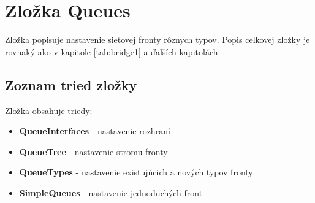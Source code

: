 \section{Zložka Queues}
Zložka popisuje nastavenie sieťovej fronty rôznych typov. Popis celkovej zložky je rovnaký ako v kapitole \ref{tab:bridge1} a ďalších kapitolách.
\subsection{Zoznam tried zložky}
Zložka obsahuje triedy:
\begin{itemize}
\item \textbf{QueueInterfaces} - nastavenie rozhraní
\item \textbf{QueueTree} - nastavenie stromu fronty
\item \textbf{QueueTypes} - nastavenie existujúcich a nových typov fronty
\item \textbf{SimpleQueues} - nastavenie jednoduchých front
\end{itemize}

